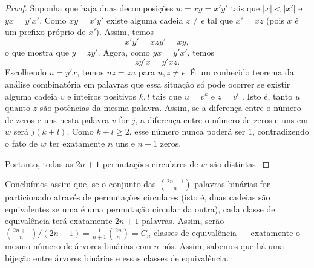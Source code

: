 \begin{proof}
    Suponha que haja duas decomposições $w = xy = x'y'$
    tais que $|x| < |x'|$ e $yx = y'x'$.
    Como $xy = x'y'$
    existe alguma cadeia $z \neq \epsilon$
    tal que $x' = xz$
    (pois $x$ é um prefixo próprio de $x'$).
    Assim, temos
    \begin{equation*}
        x'y' = xzy' = xy,
    \end{equation*}
    o que mostra que $y = zy'$.
    Agora,
    como $yx = y'x'$,
    temos
    \begin{equation*}
        zy'x = y'xz.
    \end{equation*}
    Escolhendo $u = y'x$, temos $uz = zu$
    para $u, z \neq \epsilon$.
    É um conhecido teorema da análise combinatória em palavras
    que essa situação só pode ocorrer se
    existir alguma cadeia $v$ e inteiros positivos $k, l$ tais que
    $u = v^k$ e $z = v^l$ \cite[p.~32]{Shallit2008}.
    Isto é, tanto $u$ quanto $z$ são potências da mesma palavra.
    Assim,
    se a diferença entre o número de zeros e uns nesta palavra $v$ for $j$,
    a diferença entre o número de zeros e uns em $w$ será $j(k + l)$.
    Como $k + l \geq 2$,
    esse número nunca poderá ser $1$,
    contradizendo o fato de $w$ ter exatamente $n$ uns e $n+1$ zeros.

    Portanto, todas as $2n+1$ permutações circulares de $w$ são distintas.
\end{proof}

Concluímos assim que,
se o conjunto das $\binom{2n+1}{n}$ palavras binárias
for particionado através de permutações circulares
(isto é, duas cadeias são equivalentes se uma é uma permutação circular da outra),
cada classe de equivalência terá exatamente $2n+1$ palavras.
Assim,
serão $\binom{2n+1}{n}/(2n+1) = \frac{1}{n+1} \binom{2n}{n} = C_n$
classes de equivalência
--- exatamente o mesmo número de árvores binárias com $n$ nós.
Assim,
sabemos que há uma bijeção entre árvores binárias e essas classes de equivalência.

